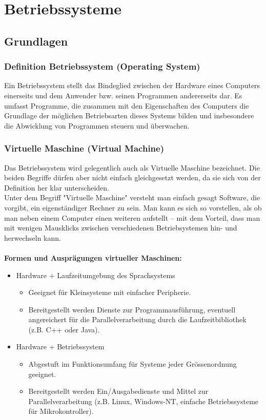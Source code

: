 \section{Betriebssysteme}

\subsection{Grundlagen}

\subsubsection{Definition Betriebssystem (Operating System)}
Ein Betriebssystem stellt das Bindeglied zwischen der Hardware eines Computers einerseits und dem Anwender bzw. seinen Programmen andererseits dar. Es umfasst Programme, die zusammen mit den Eigenschaften des Computers die Grundlage der möglichen Betriebsarten dieses Systems bilden und insbesondere die Abwicklung von Programmen steuern und überwachen.

\subsubsection{Virtuelle Maschine (Virtual Machine)}
Das Betriebssystem wird gelegentlich auch als Virtuelle Maschine bezeichnet. Die beiden Begriffe dürfen aber nicht einfach gleichgesetzt werden, da sie sich von der Definition her klar unterscheiden. \\
Unter dem Begriff "Virtuelle Maschine" versteht man einfach gesagt Software, die vorgibt, ein eigenständiger Rechner zu sein. Man kann es sich so vorstellen, als ob man neben einem Computer einen weiteren aufstellt – mit dem Vorteil, dass man mit wenigen Mausklicks zwischen verschiedenen Betriebsystemen hin- und herwechseln kann.\\\\
\textbf{Formen und Ausprägungen virtueller Maschinen:}
\begin{itemize}
    \item Hardware + Laufzeitumgebung des Sprachsystems
    \begin{itemize}
        \item Geeignet für Kleinsysteme mit einfacher Peripherie.
        \item Bereitgestellt werden Dienste zur Programmausführung, eventuell angereichert für die Parallelverarbeitung durch die Laufzeitbibliothek (z.B. C++ oder Java).
    \end{itemize}
    \item Hardware + Betriebssystem
    \begin{itemize}
        \item Abgestuft im Funktionsumfang für Systeme jeder Grössenordnung geeignet.
        \item Bereitgestellt werden Ein/Ausgabedienste und Mittel zur Parallelverarbeitung (z.B. Linux, Windows-NT, einfache Betriebssysteme für Mikrokontroller).
    \end{itemize}
\end{itemize}

